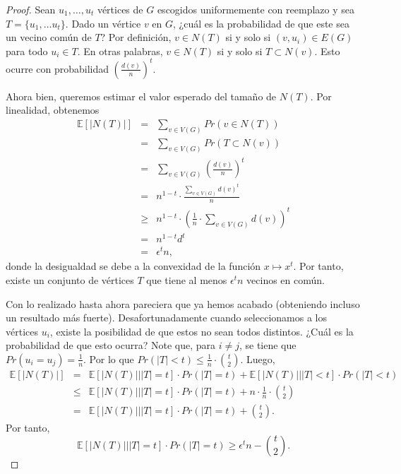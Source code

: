 \documentclass[12pt]{article}
\newcommand{\E}{\mathbb{E}}
\begin{document}
\begin{proof}
    Sean $u_1, \ldots, u_t$ vértices de $G$ escogidos uniformemente con reemplazo y sea $T = \{u_1, \ldots u_t\}$.
    Dado un vértice $v$ en $G$, ¿cuál es la probabilidad de que este sea un vecino común de 
    $T$? Por definición, $v \in N(T)$ si y solo si $(v, u_i) \in E(G)$ para todo $u_i \in T$.
    En otras palabras, $v \in N(T)$ si y solo si $T \subset N(v)$. Esto ocurre con probabilidad
    $\left(\frac{d(v)}{n}\right)^t$.

    Ahora bien, queremos estimar el valor esperado del tamaño de $N(T)$. Por linealidad, obtenemos
    \begin{eqnarray*}
        \E[\vert N(T) \vert] &=& \sum_{v \in V(G)} Pr(v \in N(T))  \\
                             &=& \sum_{v \in V(G)} Pr(T \subset N(v)) \\
                             &=& \sum_{v \in V(G)} \left(\frac{d(v)}{n}\right)^t \\
                             &=&  n^{1-t} \cdot \frac{\sum_{v \in V(G)} d(v)^t}{n} \\
                             &\geq& n^{1-t} \cdot \left( \frac{1}{n} \cdot \sum_{v \in V(G)} d(v) \right)^t\\
                             &=& n^{1-t} d^t \\ 
                            &=& \epsilon^t n,
        \end{eqnarray*}
    donde la desigualdad se debe a la convexidad de la función $x \mapsto x^t$. Por tanto, existe un conjunto de 
    vértices $T$ que tiene al menos $\epsilon^t n$ vecinos en común.

    Con lo realizado hasta ahora pareciera que ya hemos acabado (obteniendo incluso un resultado más fuerte). Desafortunadamente
    cuando seleccionamos a los vértices $u_i$, existe la posibilidad de que estos no sean todos distintos. ¿Cuál es la probabilidad
    de que esto ocurra? Note que, para $i \neq j$, se tiene que $Pr(u_i = u_j) = \frac{1}{n}$. 
    Por lo que $Pr(\vert T \vert < t) \leq \frac{1}{n}\cdot \binom{t}{2}$. Luego,
    \begin{eqnarray*}
    \E[\vert N(T)\vert] &=& \E[\vert N(T)\vert | \vert T \vert = t] \cdot Pr( \vert T \vert = t) + \E[\vert N(T)\vert | \vert T \vert < t] \cdot Pr( \vert T \vert < t) \\
                        &\leq& \E[\vert N(T)\vert | \vert T \vert = t] \cdot Pr( \vert T \vert = t) + n \cdot \frac{1}{n}\cdot \binom{t}{2}\\
                        &=& \E[\vert N(T)\vert | \vert T \vert = t] \cdot Pr( \vert T \vert = t) + \binom{t}{2}.
    \end{eqnarray*}
    Por tanto,
    $$\E[\vert N(T)\vert | \vert T \vert = t] \cdot Pr( \vert T \vert = t) \geq \epsilon^t n - \binom{t}{2}.$$
\end{proof}
\end{document}
